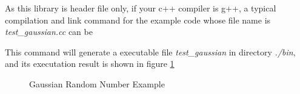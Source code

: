 As this library is header file only,
if your c++ compiler is g++, a typical compilation and link command for the example code whose file name is \textit{test\_gaussian.cc} can be

\begin{center}
\end{center}

This command will generate a executable file \textit{test\_gaussian} in directory \textit{./bin}, 
and its executation result is shown in figure \ref{fig:gaussian}

\begin{figure}
\centering
{}
\caption{Gaussian Random Number Example}
\label{fig:gaussian}
\end{figure}










